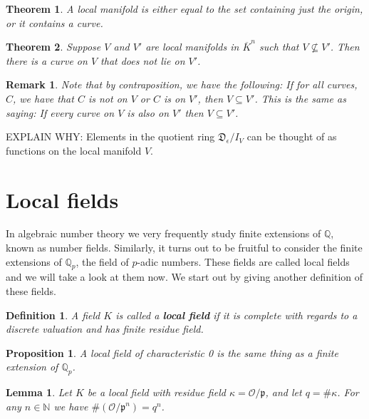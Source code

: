 \documentclass{article}
\newtheorem{theorem}{Theorem}[section]
\newtheorem{definition}{Definition}[section]
\newtheorem{proposition}{Proposition}[section]
\newtheorem{lemma}{Lemma}[section]
\newtheorem{remark}{Remark}[section]
\newcommand{\mfrak}[1]{\mathfrak{#1}}
\newcommand{\mcal}[1]{\mathcal{#1}}
\newcommand{\mbb}[1]{\mathbb{#1}}
\begin{document}
\begin{theorem}
    A local manifold is either equal to the set containing just the origin, or it contains a curve.
\end{theorem}

\begin{theorem}
    Suppose $V$ and $V'$ are local manifolds in $\overline K^n$ such that $V \nsubseteq V'$. Then there is a curve on $V$ that does not lie on $V'$.
\end{theorem}
\begin{remark}
    Note that by contraposition, we have the following: If for all curves, $C$, we have that $C$ is not on $V$ or $C$ is on $V'$, then $V \subseteq V'$. This is the same as saying: If every curve on $V$ is also on $V'$ then $V \subseteq V'$.
\end{remark}




EXPLAIN WHY: Elements in the quotient ring $\mfrak D_\epsilon / I_V$ can be thought of as functions on the local manifold $V$.


\section{Local fields}
In algebraic number theory we very frequently study finite extensions of $\mbb Q$, known as number fields. Similarly, it turns out to be fruitful to consider the finite extensions of $\mbb Q_p$, the field of $p$-adic numbers. These fields are called local fields and we will take a look at them now. We start out by giving another definition of these fields.

\begin{definition}
    A field $K$ is called a \textbf{local field} if it is complete with regards to a discrete valuation and has finite residue field.
\end{definition}

\begin{proposition}
    A local field of characteristic 0 is the same thing as a finite extension of $\mbb Q_p$.
\end{proposition}

\begin{lemma}\label{lem: Valuation ring mod power of prime is finite in local field}
    Let $K$ be a local field with residue field $\kappa = \mcal O / \mfrak p$, and let $q = \# \kappa$. For any $n \in \mbb N$ we have $\# (\mcal O / \mfrak p^n) = q^n$.
\end{lemma}
\end{document}
